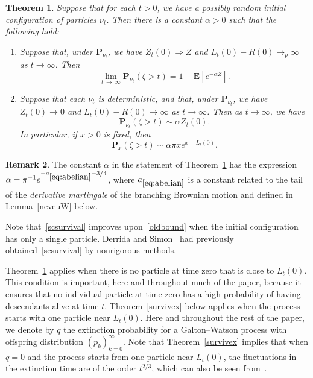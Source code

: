 \documentclass[10pt]{amsart}
\newtheorem{theo}{Theorem}[section]
\theoremstyle{definition}\newtheorem{defi}[theo]{Definition}\newtheorem{rema}[theo]{Remark}\newtheorem{exam}[theo]{Example}\newtheorem{exem}[theo]{Example}\newtheorem{nota}[theo]{Notation}
\newcommand*\E{\mathbf{E}}
\renewcommand*\P{\mathbf{P}}
\newcommand{\1} {\mathds{1}}
\begin{document}
\begin{theo}\label{survival}
Suppose that for each $t > 0$, we have a possibly random initial configuration of particles $\nu_t$. Then there is a constant $\alpha > 0$ such that the following hold:
\begin{enumerate}
\item\label{theo1.1.1} Suppose that, under $\P_{\nu_t}$, we have $Z_t(0) \Rightarrow Z$ and $L_t(0) - R(0) \rightarrow_p \infty$ as $t \rightarrow \infty$. Then
\[
\lim_{t\,\rightarrow\,\infty} \P_{\nu_t}(\zeta > t) = 1 - \E\left[e^{-\alpha Z}\right].
\]

\item\label{theo1.1.2} Suppose that each $\nu_t$ is deterministic, and that, under $\P_{\nu_t}$, we have $Z_t(0) \rightarrow 0$ and $L_t(0) - R(0) \rightarrow \infty$ as $t \rightarrow \infty$. Then as $t \rightarrow \infty$, we have
\[
\P_{\nu_t}(\zeta > t) \sim \alpha Z_t(0).
\]
In particular, if $x > 0$ is fixed, then
\begin{equation}\label{scsurvival}
\P_x(\zeta > t) \sim \alpha \pi x e^{x-L_t(0)}.
\end{equation}
\end{enumerate}
\end{theo}


\begin{rema}
The constant $\alpha$ in the statement of Theorem~\ref{survival} has the expression $\alpha = \pi^{-1}e^{-a_{\eqref{eq:abelian}}-3/4}$, where $a_{\eqref{eq:abelian}}$ is a constant related to the tail of the \emph{derivative martingale} of the branching Brownian motion and defined in Lemma~\ref{neveuW} below.
\end{rema}

Note that~\eqref{scsurvival} improves upon~\eqref{oldbound} when the initial configuration has only a single particle. Derrida and Simon~\cite{ds07} had previously obtained~\eqref{scsurvival} by nonrigorous methods.

Theorem~\ref{survival} applies when there is no particle at time zero that is close to $L_t(0)$. This condition is important, here and throughout much of the paper, because it ensures that no individual particle at time zero has a high probability of having descendants alive at time $t$. Theorem~\ref{survivex} below applies when the process starts with one particle near $L_t(0)$. Here and throughout the rest of the paper, we denote by $q$ the extinction probability for a Galton--Watson process with offspring distribution $(p_k)_{k=0}^{\infty}$. Note that Theorem~\ref{survivex} implies that when $q = 0$ and the process starts from one particle near $L_t(0)$, the fluctuations in the extinction time are of the order $t^{2/3}$, which can also be seen from~\cite[Theorem~2]{bbs}.
\end{document}
